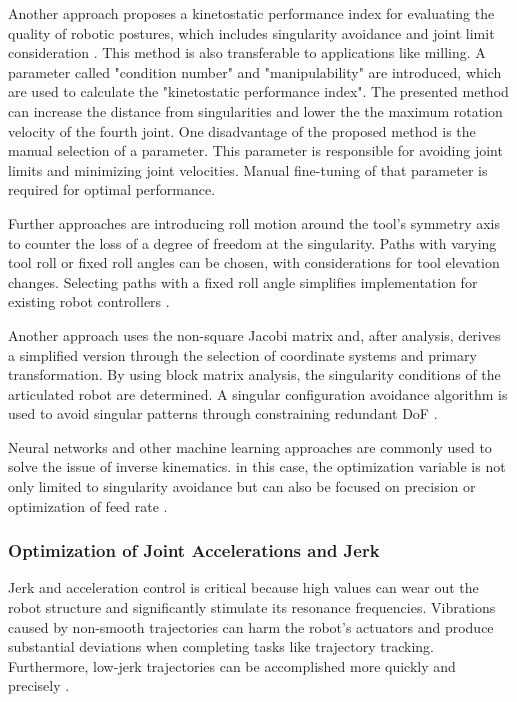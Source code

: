 Another approach proposes a kinetostatic performance index for evaluating the quality of robotic postures, which includes singularity avoidance and joint limit consideration \cite{Huo.2008}. This method is also transferable to applications like milling. A parameter called "condition number" and "manipulability" are introduced, which are used to calculate the "kinetostatic performance index". The presented method can increase the distance from singularities and lower the the maximum rotation velocity of the fourth joint. One disadvantage of the proposed method is the manual selection of a parameter. This parameter is responsible for avoiding joint limits and minimizing joint velocities. Manual fine-tuning of that parameter is required for optimal performance. 

Further approaches are introducing roll motion around the tool's symmetry axis to counter the loss of a degree of freedom at the singularity. Paths with varying tool roll or fixed roll angles can be chosen, with considerations for tool elevation changes. Selecting paths with a fixed roll angle simplifies implementation for existing robot controllers \cite{Milenkovic.2021}.

Another approach uses the non-square Jacobi matrix and, after analysis, derives a simplified version through the selection of coordinate systems and primary transformation. By using block matrix analysis, the singularity conditions of the articulated robot are determined.
A singular configuration avoidance algorithm is used to avoid singular patterns through constraining redundant DoF \cite{Shi.2021}.

Neural networks and other machine learning approaches are commonly used to solve the issue of inverse kinematics. in this case, the optimization variable is not only limited to singularity avoidance but can also be focused on precision or optimization of feed rate \cite{Wei.2014}.

\subsubsection{Optimization of Joint Accelerations and Jerk}

Jerk and acceleration control is critical because high values can wear out the robot structure and significantly stimulate its resonance frequencies. Vibrations caused by non-smooth trajectories can harm the robot's actuators and produce substantial deviations when completing tasks like trajectory tracking. Furthermore, low-jerk trajectories can be accomplished more quickly and precisely \cite{Gasparetto.2010}.


